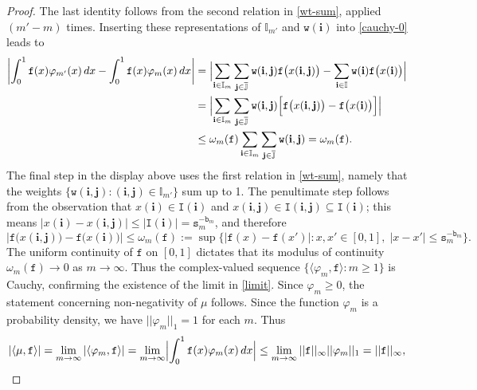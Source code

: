 \documentclass[12pt, twoside]{article}
\theoremstyle{definition}
\numberwithin{equation}{section}
\begin{document}
\begin{proof}
The last identity follows from the second relation in \eqref{wt-sum}, applied $(m'-m)$ times. Inserting these representations of $\mathbb I_{m'}$ and $\mathtt w(\mathbf i)$ into \eqref{cauchy-0} leads to  
\begin{align*} 
\left| \int_{0}^{1} \mathtt f(x) \varphi_{m'}(x) \, dx - \int_{0}^{1} \mathtt f(x) \varphi_m(x) \, dx  \right| &= \Bigl| \sum_{\mathbf i \in \mathbb I_m} \sum_{\mathbf j \in \overline{\mathbb J}}\mathtt w(\mathbf i, \mathbf j) \mathtt f\bigl(x(\mathbf i, \mathbf j)\bigr) - \sum_{\mathbf i \in \mathbb I} \mathtt w(\mathbf i) \mathtt f\bigl(x(\mathbf i)\bigr) \Bigr| \\ 
&= \Bigl| \sum_{\mathbf i \in \mathbb I_m} \sum_{\mathbf j \in \overline{\mathbb J}}\mathtt w(\mathbf i, \mathbf j) \Bigl[ \mathtt f\bigl(x(\mathbf i, \mathbf j)\bigr) - \mathtt f\bigl(x(\mathbf i)\bigr) \Bigr] \Bigr| \\
&\leq \omega_m(\mathtt f) \sum_{\mathbf i \in\mathbb I_m} \sum_{\mathbf j \in \overline{\mathbb J}} \mathtt w(\mathbf i, \mathbf j) = \omega_m(\mathtt f).
\end{align*}
The final step in the display above uses the first relation in \eqref{wt-sum}, namely that the weights $\{\mathtt w(\mathbf i, \mathbf j) : (\mathbf i, \mathbf j) \in \mathbb I_{m'}\}$ sum up to 1. The penultimate step follows from the observation that $x(\mathbf i) \in \mathtt I(\mathbf i)$ and $x(\mathbf i, \mathbf j) \in \mathtt I(\mathbf i, \mathbf j) \subseteq \mathtt I(\mathbf i)$; this means $|x(\mathbf i) - x(\mathbf i, \mathbf j)| \leq |\mathtt I(\mathbf i)| = \mathtt s_m^{-\mathtt b_m}$, and therefore  
 \[ \bigl| \mathtt f\bigl(x(\mathbf i, \mathbf j)\bigr) - \mathtt f\bigl(x(\mathbf i)\bigr) \bigr| \leq  \omega_m(\mathtt f) := \sup \bigl\{|\mathtt f(x) - \mathtt f(x')| : x, x' \in [0,1], \; |x - x'| \leq \mathtt s_m^{-\mathtt b_m}  \bigr\}. \] 
The uniform continuity of $\mathtt f$ on $[0,1]$ dictates that its modulus of continuity $\omega_m(\mathtt f) \rightarrow 0$ as $m \rightarrow \infty$. Thus the complex-valued sequence $\bigl\{\langle \varphi_m, \mathtt f \rangle : m \geq 1\}$ is Cauchy, confirming the existence of the limit in \eqref{limit}. Since $\varphi_m \geq 0$, the statement concerning non-negativity of $\mu$ follows. Since the function $\varphi_m$ is a probability density, we have $||\varphi_m||_1=1$ for each $m$. Thus  
\[ |\langle \mu, \mathtt f \rangle | = \lim_{m \rightarrow \infty} |\langle \varphi_m, \mathtt f \rangle | = \lim_{m \rightarrow \infty} \Bigl| \int_{0}^{1} \mathtt f(x) \varphi_m(x) \, dx \Bigr| \leq \lim_{m \rightarrow \infty}||\mathtt f||_{\infty} ||\varphi_m||_1 = ||\mathtt f||_{\infty}, \] 

\end{proof}
\end{document}
